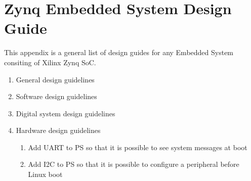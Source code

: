 \chapter{Zynq Embedded System Design Guide}\label{apndx:ZynqProjectTips}

This appendix is a general list of design guides for any Embedded System consiting of Xilinx Zynq SoC.

\begin{enumerate}
  \item General design guidelines
  \item Software design guidelines
  \item Digital system design guidelines
  \item Hardware design guidelines 

    \begin{enumerate}
      \item Add UART to PS so that it is possible to see system messages at boot
      \item Add I2C to PS so that it is possible to configure a peripheral before Linux boot
    \end{enumerate}

\end{enumerate}


\clearpage
\newpage
